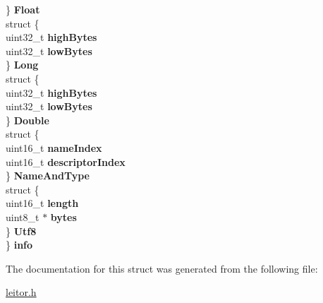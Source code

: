\begin{DoxyCompactItemize}
\begin{tabbing}
\>\} {\bfseries Float}\\
\>struct \{\\
\>\>uint32\_t {\bfseries highBytes}\\
\>\>uint32\_t {\bfseries lowBytes}\\
\>\} {\bfseries Long}\\
\>struct \{\\
\>\>uint32\_t {\bfseries highBytes}\\
\>\>uint32\_t {\bfseries lowBytes}\\
\>\} {\bfseries Double}\\
\>struct \{\\
\>\>uint16\_t {\bfseries nameIndex}\\
\>\>uint16\_t {\bfseries descriptorIndex}\\
\>\} {\bfseries NameAndType}\\
\>struct \{\\
\>\>uint16\_t {\bfseries length}\\
\>\>uint8\_t $\ast$ {\bfseries bytes}\\
\>\} {\bfseries Utf8}\\
\} {\bfseries info}\\

\end{tabbing}\end{DoxyCompactItemize}


The documentation for this struct was generated from the following file\+:\begin{DoxyCompactItemize}
\item 
\hyperlink{leitor_8h}{leitor.\+h}\end{DoxyCompactItemize}

